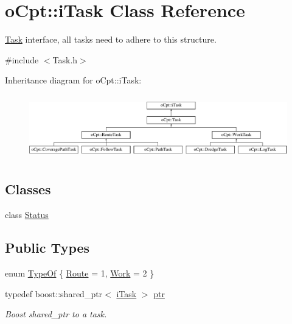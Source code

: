 \hypertarget{classo_cpt_1_1i_task}{}\section{o\+Cpt\+:\+:i\+Task Class Reference}
\label{classo_cpt_1_1i_task}


\hyperlink{classo_cpt_1_1_task}{Task} interface, all tasks need to adhere to this structure.  




{\ttfamily \#include $<$Task.\+h$>$}

Inheritance diagram for o\+Cpt\+:\+:i\+Task\+:\begin{figure}[H]
\begin{center}
\leavevmode
\includegraphics[height=2.817610cm]{classo_cpt_1_1i_task}
\end{center}
\end{figure}
\subsection*{Classes}
\begin{DoxyCompactItemize}
\item 
class \hyperlink{classo_cpt_1_1i_task_1_1_status}{Status}
\end{DoxyCompactItemize}
\subsection*{Public Types}
\begin{DoxyCompactItemize}
\item 
enum \hyperlink{classo_cpt_1_1i_task_a10d8726eb8957c2c305f468cf15b9f11}{Type\+Of} \{ \hyperlink{classo_cpt_1_1i_task_a10d8726eb8957c2c305f468cf15b9f11a93ce60928daa3b96dad6b0ed409f70bd}{Route} = 1, 
\hyperlink{classo_cpt_1_1i_task_a10d8726eb8957c2c305f468cf15b9f11abd0ae243043005573580ef90dff3d6ee}{Work} = 2
 \}
\item 
typedef boost\+::shared\+\_\+ptr$<$ \hyperlink{classo_cpt_1_1i_task}{i\+Task} $>$ \hyperlink{classo_cpt_1_1i_task_add2b02b5c97e63a1b7d6943ea4571543}{ptr}
\begin{DoxyCompactList}\small\item\em Boost shared\+\_\+ptr to a task. \end{DoxyCompactList}\end{DoxyCompactItemize}
